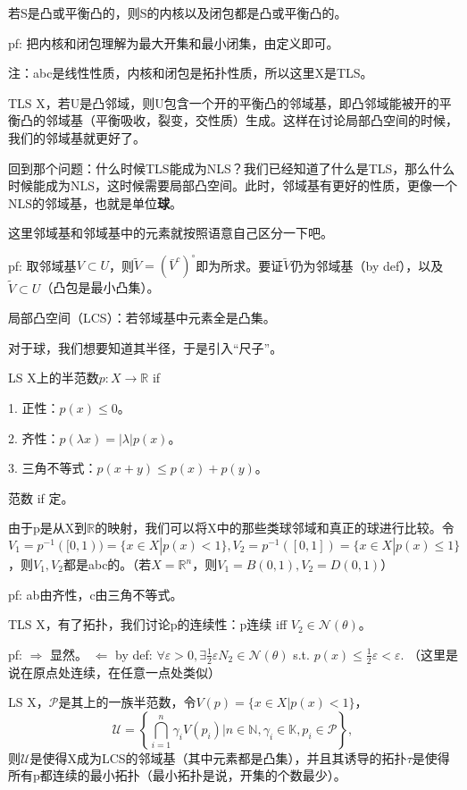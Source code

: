 若S是凸或平衡凸的，则S的内核以及闭包都是凸或平衡凸的。

pf: 把内核和闭包理解为最大开集和最小闭集，由定义即可。

注：abc是线性性质，内核和闭包是拓扑性质，所以这里X是TLS。

\begin{thm}
  TLS X，若U是凸邻域，则U包含一个开的平衡凸的邻域基，即凸邻域能被开的平衡凸的邻域基（平衡吸收，裂变，交性质）生成。这样在讨论局部凸空间的时候，我们的邻域基就更好了。
\end{thm}

回到那个问题：什么时候TLS能成为NLS？我们已经知道了什么是TLS，那么什么时候能成为NLS，这时候需要局部凸空间。此时，邻域基有更好的性质，更像一个NLS的邻域基，也就是单位\textbf{球}。

这里邻域基和邻域基中的元素就按照语意自己区分一下吧。

pf: 取邻域基$V \subset U$，则$\tilde{V} = (\bar{V}^c)^{\circ}$即为所求。要证$\tilde{V}$仍为邻域基（by def），以及$\tilde{V} \subset U$（凸包是最小凸集）。

局部凸空间（LCS）：若邻域基中元素全是凸集。

对于球，我们想要知道其半径，于是引入“尺子”。

LS X上的半范数$p: X \to \mathbb{R}$ if

1. 正性：$p(x) \le 0$。

2. 齐性：$p(\lambda x) = |\lambda| p(x)$。

3. 三角不等式：$p(x + y) \le p(x) + p(y)$。

范数 if 定。

由于p是从X到$\mathbb{R}$的映射，我们可以将X中的那些类球邻域和真正的球进行比较。令$V_1 = p^{-1}([0, 1)) = \{x \in X | p(x) < 1\}, V_2 = p^{-1}([0, 1]) = \{x \in X | p(x) \le 1\}$，则$V_1, V_2$都是abc的。（若$X = \mathbb{R}^n$，则$V_1 = B(0, 1), V_2 = D(0, 1)$）

pf: ab由齐性，c由三角不等式。

TLS X，有了拓扑，我们讨论p的连续性：p连续 iff $V_2 \in \mathcal{N}(\theta)$。

pf: $\Rightarrow$ 显然。 $\Leftarrow$ by def: $\forall \varepsilon > 0, \exists \frac{1}{2} \varepsilon N_2 \in \mathcal{N}(\theta)$ s.t. $p(x) \le \frac{1}{2} \varepsilon < \varepsilon$. （这里是说在原点处连续，在任意一点处类似）

\begin{thm}
  LS X，$\mathcal{P}$是其上的一族半范数，令$V(p) = \{x \in X | p(x) < 1\}$，
  \[
    \mathcal{U} = \left\lbrace \bigcap_{i = 1}^n \gamma_i V(p_i) \bigg| n \in \mathbb{N}, \gamma_i \in \mathbb{K}, p_i \in \mathcal{P} \right\rbrace, 
  \]
  则$\mathcal{U}$是使得X成为LCS的邻域基（其中元素都是凸集），并且其诱导的拓扑$\tau$是使得所有p都连续的最小拓扑（最小拓扑是说，开集的个数最少）。
\end{thm}

